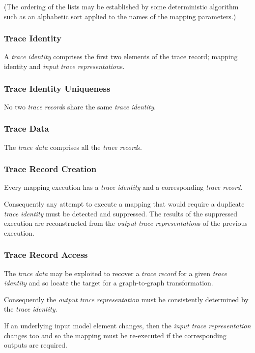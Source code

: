 \documentclass[runningheads,a4paper]{llncs}
\begin{document}
(The ordering of the lists may be established by some deterministic algorithm such as an alphabetic sort applied to the names of the mapping parameters.)

\subsubsection{Trace Identity}

A \emph{trace identity} comprises the first two elements of the trace record; mapping identity and \emph{input trace representation}s.

\subsubsection{Trace Identity Uniqueness}

No two \emph{trace record}s share the same \emph{trace identity}.

\subsubsection{Trace Data}

The \emph{trace data} comprises all the \emph{trace record}s.

\subsubsection{Trace Record Creation}

Every mapping execution has a \emph{trace identity} and a corresponding \emph{trace record}.

Consequently any attempt to execute a mapping that would require a duplicate \emph{trace identity} must be detected and suppressed. The results  of the suppressed execution are reconstructed from the \emph{output trace representation}s of the previous execution.

\subsubsection{Trace Record Access}

The \emph{trace data} may be exploited to recover a \emph{trace record} for a given \emph{trace identity} and so locate the target for a graph-to-graph transformation.

Consequently the \emph{output trace representation} must be consistently determined by the \emph{trace identity}.

If an underlying input model element changes, then the \emph{input trace representation} changes too and so the mapping must be re-executed if the corresponding outputs are required.
\end{document}
